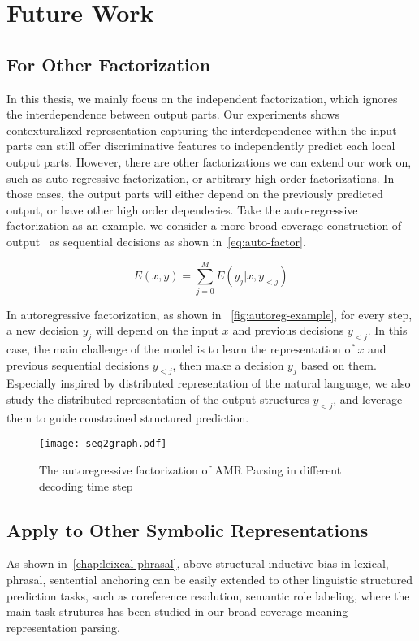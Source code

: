 \section{Future Work}
\label{sec:conclusions:future}

\subsection{For Other Factorization}
\label{ssec:future:other-factorization}
In this thesis, we mainly focus on the independent factorization,
which ignores the interdependence between output parts.  Our
experiments shows contexturalized representation capturing the
interdependence within the input parts can still offer discriminative
features to independently predict each local output parts. However,
there are other factorizations we can extend our work on, such as
auto-regressive factorization, or arbitrary high order
factorizations. In those cases, the output parts will either depend on
the previously predicted output, or have other high order
dependecies. Take the auto-regressive factorization as an example, we
consider a more broad-coverage construction of output \OUT~as
sequential decisions as shown in~\autoref{eq:auto-factor}.

\begin{equation}
  \label{eq:auto-factor}
E(x, y)=\sum_{j=0}^{M}E(y_{j}|x,y_{<j})
\end{equation}

In autoregressive factorization, as shown in
~\autoref{fig:autoreg-example}, for every step, a new decision $y_{j}$
will depend on the input $x$ and previous decisions $y_{<j}$. In this
case, the main challenge of the model is to learn the representation
of $x$ and previous sequential decisions $y_{<j}$, then make a
decision $y_{j}$ based on them.  Especially inspired by distributed
representation of the natural language, we also study the distributed
representation of the output structures $y_{<j}$, and leverage them to
guide constrained structured prediction.

\begin{figure}[h]
\centering
\texttt{[image: seq2graph.pdf]}
\caption{\label{fig:autoreg-example}The autoregressive factorization
  of AMR Parsing in different decoding time step}
\end{figure}

\subsection{Apply to Other Symbolic Representations}
\label{ssec:future:application}
As shown in~\autoref{chap:leixcal-phrasal}, above structural inductive
bias in lexical, phrasal, sentential anchoring can be easily extended
to other linguistic structured prediction tasks, such as coreference
resolution, semantic role labeling, where the main task strutures has
been studied in our broad-coverage meaning representation parsing.

